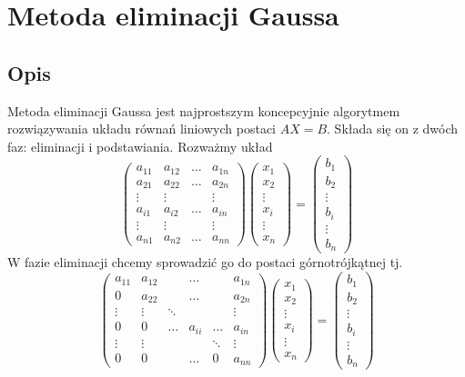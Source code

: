 \documentclass[11pt,wide]{mwart}
\begin{document}
\section{Metoda eliminacji Gaussa}
\subsection{Opis} \label{p:gaussopis}
Metoda eliminacji Gaussa jest najprostszym koncepcyjnie algorytmem rozwiązywania układu równań liniowych postaci $ AX = B $.
Składa się on z dwóch faz: eliminacji i podstawiania. Rozważmy układ
$$
\left(\begin{matrix}
a_{11} & a_{12} & \ldots & a_{1n} \\
a_{21} & a_{22} & \ldots & a_{2n} \\
\vdots & \vdots & 		 & \vdots \\
a_{i1} & a_{i2} & \ldots & a_{in} \\
\vdots & \vdots & 		 & \vdots \\
a_{n1} & a_{n2} & \ldots & a_{nn}
\end{matrix}\right)
\left(\begin{matrix}
x_1 \\ x_2 \\ \vdots \\ x_i \\ \vdots \\ x_n
\end{matrix}\right) = 
\left(\begin{matrix}
b_1 \\ b_2 \\ \vdots \\ b_i \\ \vdots \\ b_n
\end{matrix}\right)
$$
W fazie eliminacji chcemy sprowadzić go do postaci górnotrójkątnej tj.
$$
\left(\begin{matrix}
a_{11} & a_{12} &  & \ldots  & & a_{1n} \\
0 & a_{22} &  & \ldots  & & a_{2n} \\
\vdots & \vdots & \ddots &		 & & \vdots \\
0 & 0 & \ldots & a_{ii}  & \ldots & a_{in} \\
\vdots & \vdots &  &		 & \ddots & \vdots \\
0 & 0 &  & \ldots  & 0 & a_{nn}
\end{matrix}\right)
\left(\begin{matrix}
x_1 \\ x_2 \\ \vdots \\ x_i \\ \vdots \\ x_n
\end{matrix}\right) = 
\left(\begin{matrix}
b_1 \\ b_2 \\ \vdots \\ b_i \\ \vdots \\ b_n
\end{matrix}\right)
$$
\end{document}
